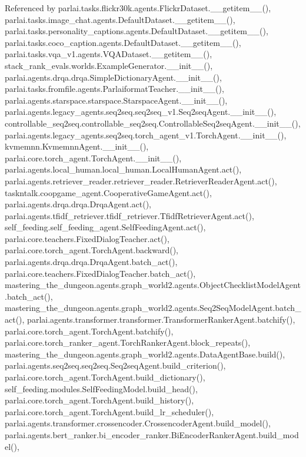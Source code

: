 Referenced by parlai.\+tasks.\+flickr30k.\+agents.\+Flickr\+Dataset.\+\_\+\+\_\+getitem\+\_\+\+\_\+(), parlai.\+tasks.\+image\+\_\+chat.\+agents.\+Default\+Dataset.\+\_\+\+\_\+getitem\+\_\+\+\_\+(), parlai.\+tasks.\+personality\+\_\+captions.\+agents.\+Default\+Dataset.\+\_\+\+\_\+getitem\+\_\+\+\_\+(), parlai.\+tasks.\+coco\+\_\+caption.\+agents.\+Default\+Dataset.\+\_\+\+\_\+getitem\+\_\+\+\_\+(), parlai.\+tasks.\+vqa\+\_\+v1.\+agents.\+V\+Q\+A\+Dataset.\+\_\+\+\_\+getitem\+\_\+\+\_\+(), stack\+\_\+rank\+\_\+evals.\+worlds.\+Example\+Generator.\+\_\+\+\_\+init\+\_\+\+\_\+(), parlai.\+agents.\+drqa.\+drqa.\+Simple\+Dictionary\+Agent.\+\_\+\+\_\+init\+\_\+\+\_\+(), parlai.\+tasks.\+fromfile.\+agents.\+Parlaiformat\+Teacher.\+\_\+\+\_\+init\+\_\+\+\_\+(), parlai.\+agents.\+starspace.\+starspace.\+Starspace\+Agent.\+\_\+\+\_\+init\+\_\+\+\_\+(), parlai.\+agents.\+legacy\+\_\+agents.\+seq2seq.\+seq2seq\+\_\+v1.\+Seq2seq\+Agent.\+\_\+\+\_\+init\+\_\+\+\_\+(), controllable\+\_\+seq2seq.\+controllable\+\_\+seq2seq.\+Controllable\+Seq2seq\+Agent.\+\_\+\+\_\+init\+\_\+\+\_\+(), parlai.\+agents.\+legacy\+\_\+agents.\+seq2seq.\+torch\+\_\+agent\+\_\+v1.\+Torch\+Agent.\+\_\+\+\_\+init\+\_\+\+\_\+(), kvmemnn.\+Kvmemnn\+Agent.\+\_\+\+\_\+init\+\_\+\+\_\+(), parlai.\+core.\+torch\+\_\+agent.\+Torch\+Agent.\+\_\+\+\_\+init\+\_\+\+\_\+(), parlai.\+agents.\+local\+\_\+human.\+local\+\_\+human.\+Local\+Human\+Agent.\+act(), parlai.\+agents.\+retriever\+\_\+reader.\+retriever\+\_\+reader.\+Retriever\+Reader\+Agent.\+act(), taskntalk.\+coopgame\+\_\+agent.\+Cooperative\+Game\+Agent.\+act(), parlai.\+agents.\+drqa.\+drqa.\+Drqa\+Agent.\+act(), parlai.\+agents.\+tfidf\+\_\+retriever.\+tfidf\+\_\+retriever.\+Tfidf\+Retriever\+Agent.\+act(), self\+\_\+feeding.\+self\+\_\+feeding\+\_\+agent.\+Self\+Feeding\+Agent.\+act(), parlai.\+core.\+teachers.\+Fixed\+Dialog\+Teacher.\+act(), parlai.\+core.\+torch\+\_\+agent.\+Torch\+Agent.\+backward(), parlai.\+agents.\+drqa.\+drqa.\+Drqa\+Agent.\+batch\+\_\+act(), parlai.\+core.\+teachers.\+Fixed\+Dialog\+Teacher.\+batch\+\_\+act(), mastering\+\_\+the\+\_\+dungeon.\+agents.\+graph\+\_\+world2.\+agents.\+Object\+Checklist\+Model\+Agent.\+batch\+\_\+act(), mastering\+\_\+the\+\_\+dungeon.\+agents.\+graph\+\_\+world2.\+agents.\+Seq2\+Seq\+Model\+Agent.\+batch\+\_\+act(), parlai.\+agents.\+transformer.\+transformer.\+Transformer\+Ranker\+Agent.\+batchify(), parlai.\+core.\+torch\+\_\+agent.\+Torch\+Agent.\+batchify(), parlai.\+core.\+torch\+\_\+ranker\+\_\+agent.\+Torch\+Ranker\+Agent.\+block\+\_\+repeats(), mastering\+\_\+the\+\_\+dungeon.\+agents.\+graph\+\_\+world2.\+agents.\+Data\+Agent\+Base.\+build(), parlai.\+agents.\+seq2seq.\+seq2seq.\+Seq2seq\+Agent.\+build\+\_\+criterion(), parlai.\+core.\+torch\+\_\+agent.\+Torch\+Agent.\+build\+\_\+dictionary(), self\+\_\+feeding.\+modules.\+Self\+Feeding\+Model.\+build\+\_\+head(), parlai.\+core.\+torch\+\_\+agent.\+Torch\+Agent.\+build\+\_\+history(), parlai.\+core.\+torch\+\_\+agent.\+Torch\+Agent.\+build\+\_\+lr\+\_\+scheduler(), parlai.\+agents.\+transformer.\+crossencoder.\+Crossencoder\+Agent.\+build\+\_\+model(), parlai.\+agents.\+bert\+\_\+ranker.\+bi\+\_\+encoder\+\_\+ranker.\+Bi\+Encoder\+Ranker\+Agent.\+build\+\_\+model(), 